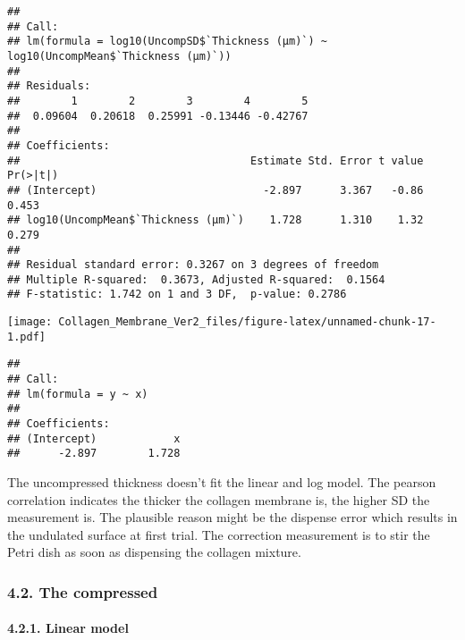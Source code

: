 \documentclass[
]{article}
\newenvironment{Shaded}{\begin{snugshade}}{\end{snugshade}}
\newcommand{\AttributeTok}[1]{\textcolor[rgb]{0.77,0.63,0.00}{#1}}
\newcommand{\ConstantTok}[1]{\textcolor[rgb]{0.00,0.00,0.00}{#1}}
\newcommand{\FunctionTok}[1]{\textcolor[rgb]{0.00,0.00,0.00}{#1}}
\newcommand{\NormalTok}[1]{#1}
\newcommand{\SpecialCharTok}[1]{\textcolor[rgb]{0.00,0.00,0.00}{#1}}
\newcommand{\StringTok}[1]{\textcolor[rgb]{0.31,0.60,0.02}{#1}}
\begin{document}
\begin{verbatim}
## 
## Call:
## lm(formula = log10(UncompSD$`Thickness (μm)`) ~ log10(UncompMean$`Thickness (μm)`))
## 
## Residuals:
##        1        2        3        4        5 
##  0.09604  0.20618  0.25991 -0.13446 -0.42767 
## 
## Coefficients:
##                                    Estimate Std. Error t value Pr(>|t|)
## (Intercept)                          -2.897      3.367   -0.86    0.453
## log10(UncompMean$`Thickness (μm)`)    1.728      1.310    1.32    0.279
## 
## Residual standard error: 0.3267 on 3 degrees of freedom
## Multiple R-squared:  0.3673, Adjusted R-squared:  0.1564 
## F-statistic: 1.742 on 1 and 3 DF,  p-value: 0.2786
\end{verbatim}

\begin{Shaded}
\end{Shaded}

\texttt{[image: Collagen\_Membrane\_Ver2\_files/figure-latex/unnamed-chunk-17-1.pdf]}

\begin{verbatim}
## 
## Call:
## lm(formula = y ~ x)
## 
## Coefficients:
## (Intercept)            x  
##      -2.897        1.728
\end{verbatim}

The uncompressed thickness doesn't fit the linear and log model. The
pearson correlation indicates the thicker the collagen membrane is, the
higher SD the measurement is. The plausible reason might be the dispense
error which results in the undulated surface at first trial. The
correction measurement is to stir the Petri dish as soon as dispensing
the collagen mixture.

\hypertarget{the-compressed-2}{%
\subsubsection{4.2. The compressed}\label{the-compressed-2}}

\hypertarget{linear-model-1}{%
\paragraph{4.2.1. Linear model}\label{linear-model-1}}
\end{document}
